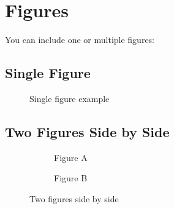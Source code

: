 \section{Figures}
You can include one or multiple figures:

\subsection{Single Figure}
\begin{figure}[h!]
\centering

\caption{Single figure example}
\end{figure}
\newpage
\subsection{Two Figures Side by Side}
\begin{figure}[h!]
\centering
\begin{subfigure}{0.45\textwidth}
  
  \caption{Figure A}
\end{subfigure}
\hfill
\begin{subfigure}{0.45\textwidth}
  
  \caption{Figure B}
\end{subfigure}
\caption{Two figures side by side}
\end{figure}

